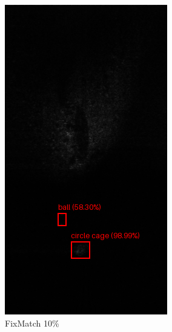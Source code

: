 \documentclass[a0,portrait]{hogent-poster}
\begin{document}
\begin{multicols}{2}
\begin{figure}[H]
\begin{subfigure}{.2\linewidth}
        \includegraphics[width=0.9\linewidth]{1_fixmatch_10pct.png}
        \caption{FixMatch 10\%}
    \end{subfigure}%
    \hfill
    \begin{subfigure}{.2\linewidth}
        \centering
        \captionsetup{justification=centering}

\end{subfigure}
\end{figure}
\end{multicols}
\end{document}
